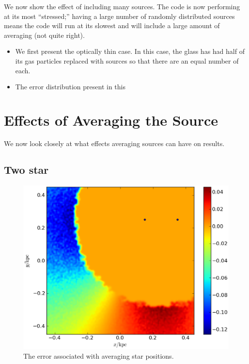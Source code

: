 We now show the effect of including many sources. The code is now performing at its most ``stressed;'' having a large number of randomly distributed sources means the code will run at its slowest and will include a large amount of averaging (not quite right).

\begin{itemize}
\item We first present the optically thin case. In this case, the glass has had half of its gas particles replaced with sources so that there are an equal number of each.
\item The error distribution present in this
\end{itemize}

\section{Effects of Averaging the Source}
\label{sec:averagingsource}

We now look closely at what effects averaging sources can have on results.

\subsection{Two star}
\label{sec:twostar}

\begin{figure}
\includegraphics[width=\textwidth]{graphics/errorMap2starthick.eps}
\caption[The error associated with averaging star positions.]{The error associated with averaging star positions.}
\label{fig:twostar}
\end{figure}


